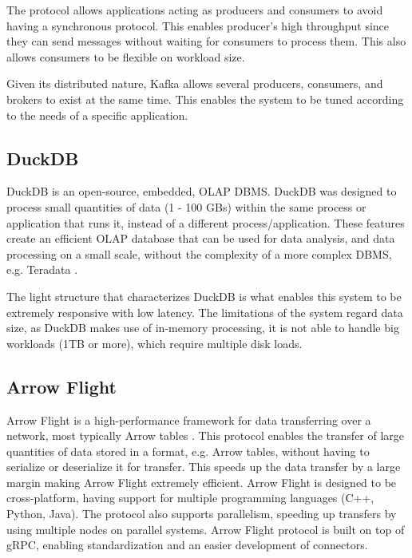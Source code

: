 The protocol allows applications acting as producers and consumers to avoid having a synchronous protocol. This enables producer's high throughput since they can send messages without waiting for consumers to process them. This also allows consumers to be flexible on workload size.

Given its distributed nature, Kafka allows several producers, consumers, and brokers to exist at the same time. This enables the system to be tuned according to the needs of a specific application. 

\subsection{DuckDB}

DuckDB \cite{raasveldtDuckDBEmbeddableAnalytical2019} is an open-source, embedded, \gls{OLAP} \gls{DBMS}. DuckDB was designed to process small quantities of data (1 - 100 GBs) within the same process or application that runs it, instead of a different process/application. These features create an efficient \gls{OLAP} database that can be used for data analysis, and data processing on a small scale, without the complexity of a more complex \gls{DBMS}, e.g. Teradata \cite{shahImproveYourOLAP}. 

The light structure that characterizes DuckDB is what enables this system to be extremely responsive with low latency. The limitations of the system regard data size, as DuckDB makes use of in-memory processing, it is not able to handle big workloads (1TB or more), which require multiple disk loads.

\subsection{Arrow Flight}

Arrow Flight is a high-performance framework for data transferring over a network, most typically Arrow tables \cite{wesmIntroducingApacheArrow2019}. This protocol enables the transfer of large quantities of data stored in a format, e.g. Arrow tables, without having to serialize or deserialize it for transfer. This speeds up the data transfer by a large margin making Arrow Flight extremely efficient. Arrow Flight is designed to be cross-platform, having support for multiple programming languages (C++, Python, Java). The protocol also supports parallelism, speeding up transfers by using multiple nodes on parallel systems. Arrow Flight protocol is built on top of gRPC, enabling standardization and an easier development of connectors. 